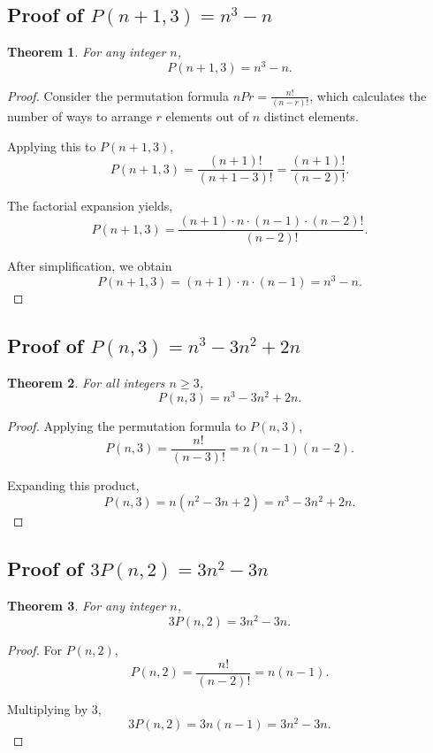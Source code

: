 \documentclass[12pt]{article}
\newtheorem{theorem}{Theorem}
\begin{document}
\subsection{Proof of \( P(n+1,3) = n^3 - n \)}
\begin{theorem}
For any integer \( n \),
\[ P(n+1,3) = n^3 - n. \]
\end{theorem}

\begin{proof}
Consider the permutation formula \( nPr = \frac{n!}{(n-r)!} \), which calculates the number of ways to arrange \( r \) elements out of \( n \) distinct elements. 

Applying this to \( P(n+1, 3) \),
\[ P(n+1, 3) = \frac{(n+1)!}{(n+1-3)!} = \frac{(n+1)!}{(n-2)!}. \]

The factorial expansion yields,
\[ P(n+1, 3) = \frac{(n+1) \cdot n \cdot (n-1) \cdot (n-2)!}{(n-2)!}. \]

After simplification, we obtain
\[ P(n+1, 3) = (n+1) \cdot n \cdot (n-1) = n^3 - n. \]
\end{proof}

\subsection{Proof of \( P(n,3) = n^3 - 3n^2 + 2n \)}
\begin{theorem}
For all integers \( n \geq 3 \),
\[ P(n,3) = n^3 - 3n^2 + 2n. \]
\end{theorem}

\begin{proof}
Applying the permutation formula to \( P(n,3) \),
\[ P(n, 3) = \frac{n!}{(n-3)!} = n(n-1)(n-2). \]

Expanding this product,
\[ P(n, 3) = n(n^2 - 3n + 2) = n^3 - 3n^2 + 2n. \]
\end{proof}

\subsection{Proof of \( 3P(n,2) = 3n^2 - 3n \)}
\begin{theorem}
For any integer \( n \),
\[ 3P(n,2) = 3n^2 - 3n. \]
\end{theorem}

\begin{proof}
For \( P(n, 2) \),
\[ P(n, 2) = \frac{n!}{(n-2)!} = n(n-1). \]

Multiplying by 3,
\[ 3P(n, 2) = 3n(n-1) = 3n^2 - 3n. \]
\end{proof}
\end{document}
